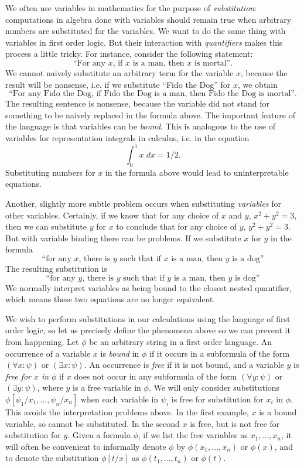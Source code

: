 We often use variables in mathematics for the purpose of \emph{substitution}: computations in algebra done with variables should remain true when arbitrary numbers are substituted for the variables. We want to do the same thing with variables in first order logic. But their interaction with \emph{quantifiers} makes this process a little tricky. For instance, consider the following statement:
%
\[ \text{``For any $x$, if $x$ is a man, then $x$ is mortal''.} \]
%
We cannot naively substitute an arbitrary term for the variable $x$, because the result will be nonsense, i.e. if we substitute ``Fido the Dog'' for $x$, we obtain
%
\[ \text{``For any Fido the Dog, if Fido the Dog is a man, then Fido the Dog is mortal''.} \]
%
The resulting sentence is nonsense, because the variable did not stand for something to be naively replaced in the formula above. The important feature of the language is that variables can be \emph{bound}. This is analogous to the use of variables for representation integrals in calculus, i.e. in the equation
%
\[ \int_0^1 x\; dx = 1/2. \]
%
Substituting numbers for $x$ in the formula above would lead to uninterpretable equations.

Another, slightly more subtle problem occurs when substituting \emph{variables} for other variables. Certainly, if we know that for any choice of $x$ and $y$, $x^2 + y^2 = 3$, then we can substitute $y$ for $x$ to conclude that for any choice of $y$, $y^2 + y^2 = 3$. But with variable binding there can be problems. If we substitute $x$ for $y$ in the formula
%
\[ \text{``for any $x$, there is $y$ such that if $x$ is a man, then $y$ is a dog''} \]
%
The resulting substitution is
%
\[ \text{``for any $y$, there is $y$ such that if $y$ is a man, then $y$ is dog''} \]
%
We normally interpret variables as being bound to the closest nested quantifier, which means these two equations are no longer equivalent.

We wish to perform substitutions in our calculations using the language of first order logic, so let us precisely define the phenomena above so we can prevent it from happening. Let $\phi$ be an arbitrary string in a first order language. An occurrence of a variable $x$ is \emph{bound} in $\phi$ if it occurs in a subformula of the form $(\forall x: \psi)$ or $(\exists x: \psi)$. An occurrence is \emph{free} if it is not bound, and a variable $y$ is \emph{free for $x$ in} $\phi$ if $x$ does not occur in any subformula of the form $(\forall y: \psi)$ or $(\exists y: \psi)$, where $y$ is a free variable in $\phi$. We will only consider substitutions $\phi[\psi_1/x_1, \dots, \psi_n/x_n]$ when each variable in $\psi_i$ is free for substitution for $x_i$ in $\phi$. This avoids the interpretation problems above. In the first example, $x$ is a bound variable, so cannot be substituted. In the second $x$ is free, but is not free for substitution for $y$. Given a formula $\phi$, if we list the free variables as $x_1, \dots, x_n$, it will often be convenient to informally denote $\phi$ by $\phi(x_1,\dots,x_n)$ or $\phi(x)$, and to denote the substitution $\phi[t/x]$ as $\phi(t_1,\dots,t_n)$ or $\phi(t)$.

